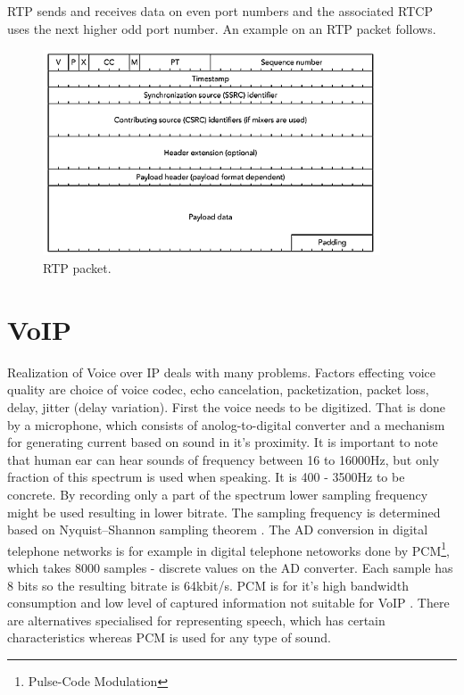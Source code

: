 RTP sends and receives data on even port numbers and the associated RTCP uses the next higher odd port number. An example on an RTP packet follows. 

\begin{figure}[ht]
	\begin{center}
	\includegraphics[width=10cm]{fig/rtp-packet.png}
	\caption{RTP packet.\cite{rtpBook}}
	\label{fig:rtpPacket}
\end{center}
\end{figure}


\section{VoIP}
Realization of Voice over IP deals with many problems. Factors effecting voice quality are choice of voice codec, echo cancelation, packetization, packet loss, delay, jitter (delay variation). First the voice needs to be digitized. That is done by a microphone, which consists of anolog-to-digital converter and a mechanism for generating current based on sound in it's proximity. It is important to note that human ear can hear sounds of frequency between 16 to 16000Hz, but only fraction of this spectrum is used when speaking. It is 400 - 3500Hz to be concrete. By recording only a part of the spectrum lower sampling frequency might be used resulting in lower bitrate. The sampling frequency is determined based on Nyquist–Shannon sampling theorem \cite{sampling-theorem}. The AD conversion in digital telephone networks is for example in digital telephone netoworks done by PCM\footnote{Pulse-Code Modulation}, which takes 8000 samples - discrete values on the AD converter. Each sample has 8 bits so the resulting bitrate is 64kbit/s. PCM is for it's high bandwidth consumption and low level of captured information not suitable for VoIP \cite{digitalSpeechBook}. There are alternatives specialised for representing speech, which has certain characteristics whereas PCM is used for any type of sound.  
 
